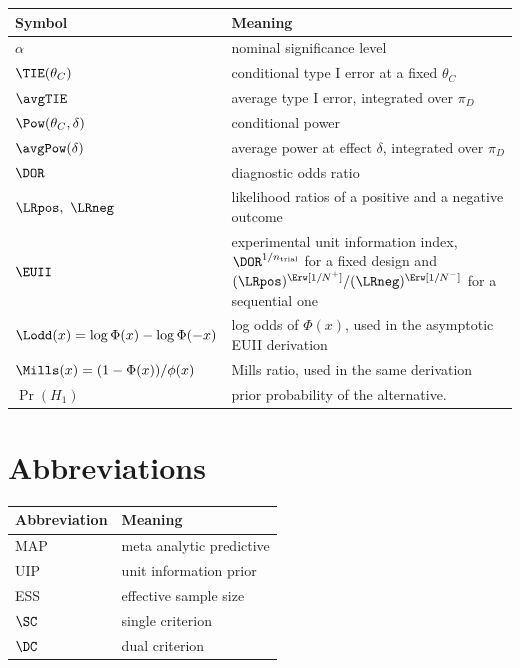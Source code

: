 \begin{tabularx}{\linewidth}{@{}lX@{}}
\toprule
Symbol & Meaning \\
\midrule
$\alpha$                & nominal significance level \\
$\TIE(\theta_C)$        & conditional type I error at a fixed $\theta_C$ \\
$\avgTIE$               & average type I error, integrated over $\pi_D$ \\
$\Pow(\theta_C,\delta)$ & conditional power \\
$\avgPow(\delta)$       & average power at effect $\delta$, integrated over $\pi_D$ \\
$\DOR$                  & diagnostic odds ratio \\
$\LRpos,\ \LRneg$       & likelihood ratios of a positive and a negative outcome \\
$\EUII$                 & experimental unit information index, $\DOR^{1/n_{\text{trial}}}$ for a fixed design and $(\LRpos)^{\Erw[1/N^+]} / (\LRneg)^{\Erw[1/N^-]}$ for a sequential one \\
$\Lodd(x) = \log\Phi(x)-\log\Phi(-x)$ & log odds of $\Phi(x)$, used in the asymptotic EUII derivation \\
$\Mills(x) = (1-\Phi(x))/\phi(x)$ & Mills ratio, used in the same derivation \\
$\Pr(H_1)$              & prior probability of the alternative. \\
\bottomrule
\end{tabularx}

\section*{Abbreviations}

\begin{tabularx}{\linewidth}{@{}lX@{}}
\toprule
Abbreviation & Meaning \\
\midrule
MAP                     & meta analytic predictive \\
UIP                     & unit information prior \\
ESS                     & effective sample size \\
$\SC$                   & single criterion \\
$\DC$                   & dual criterion \\
\bottomrule
\end{tabularx}

